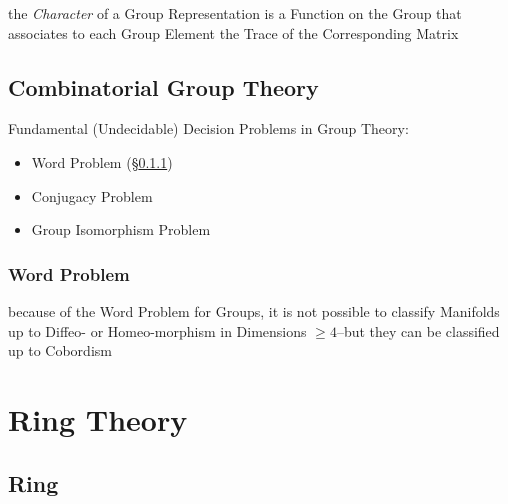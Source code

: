 the \emph{Character} of a Group Representation is a Function on the Group that
associates to each Group Element the Trace of the Corresponding Matrix



\subsection{Combinatorial Group Theory}\label{sec:combinatorial_group_theory}

Fundamental (Undecidable) Decision Problems in Group Theory:
\begin{itemize}
  \item Word Problem (\S\ref{sec:word_problem})
  \item Conjugacy Problem
  \item Group Isomorphism Problem
\end{itemize}



\subsubsection{Word Problem}\label{sec:word_problem}

because of the Word Problem for Groups, it is not possible to classify
Manifolds up to Diffeo- or Homeo-morphism in Dimensions $\geq 4$--but they can
be classified up to Cobordism




\section{Ring Theory}\label{sec:ring_theory}

\subsection{Ring}\label{sec:ring}

